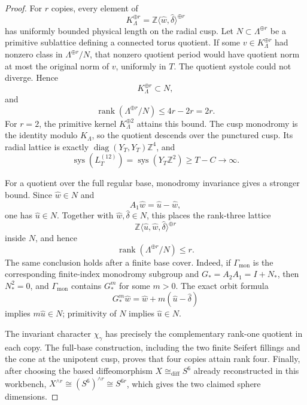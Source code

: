 \begin{proof}
For \(r\) copies, every element of
\[
 K_\Lambda^{\oplus r}
 =\mathbb Z\langle\widehat w,\widehat\delta\rangle^{\oplus r}
\]
has uniformly bounded physical length on the radial cusp.  Let
\(N\subset\Lambda^{\oplus r}\) be a primitive sublattice defining a
connected torus quotient.  If some \(v\in K_\Lambda^{\oplus r}\) had
nonzero class in \(\Lambda^{\oplus r}/N\), that nonzero quotient period
would have quotient norm at most the original norm of \(v\), uniformly in
\(T\).  The quotient systole could not diverge.  Hence
\[
 K_\Lambda^{\oplus r}\subset N,
\]
and
\[
 \operatorname{rank}(\Lambda^{\oplus r}/N)
 \leq 4r-2r=2r.
\]
For \(r=2\), the primitive kernel \(K_\Lambda^{\oplus2}\) attains this
bound.  The cusp monodromy is the identity modulo \(K_\Lambda\), so the
quotient descends over the punctured cusp.  Its radial lattice is exactly
\(\operatorname{diag}(Y_T,Y_T)\mathbb Z^4\), and
\[
 \operatorname{sys}(L_T^{(12)})
 =\operatorname{sys}(Y_T\mathbb Z^2)\geq T-C\longrightarrow\infty.
\]

For a quotient over the full regular base, monodromy invariance gives a
stronger bound.  Since \(\widehat w\in N\) and
\[
 A_1\widehat w=\widehat u-\widehat w,
\]
one has \(\widehat u\in N\).  Together with
\(\widehat w,\widehat\delta\in N\), this places the rank-three lattice
\[
 \mathbb Z\langle\widehat u,\widehat w,
 \widehat\delta\rangle^{\oplus r}
\]
inside \(N\), and hence
\[
 \operatorname{rank}(\Lambda^{\oplus r}/N)\leq r.
\]
The same conclusion holds after a finite base cover.  Indeed, if
\(\Gamma_{\mathrm{mon}}\) is the corresponding finite-index monodromy
subgroup and \(G_*=A_2A_1=I+N_*\), then \(N_*^2=0\), and
\(\Gamma_{\mathrm{mon}}\) contains \(G_*^m\) for
some \(m>0\).  The exact orbit formula
\[
 G_*^m\widehat w
 =\widehat w+m(\widehat u-\widehat\delta)
\]
implies \(m\widehat u\in N\); primitivity of \(N\) implies
\(\widehat u\in N\).

The invariant character \(\chi_\gamma\) has precisely the complementary
rank-one quotient in each copy.  The full-base construction, including the
two finite Seifert fillings and the cone at the unipotent cusp, proves that
four copies attain rank four.  Finally, after choosing the based
diffeomorphism \(X\cong_{\mathrm{diff}}S^6\) already reconstructed in this
workbench,
\(X^{\wedge r}\cong(S^6)^{\wedge r}\cong S^{6r}\), which gives the two
claimed sphere dimensions.
\end{proof}

